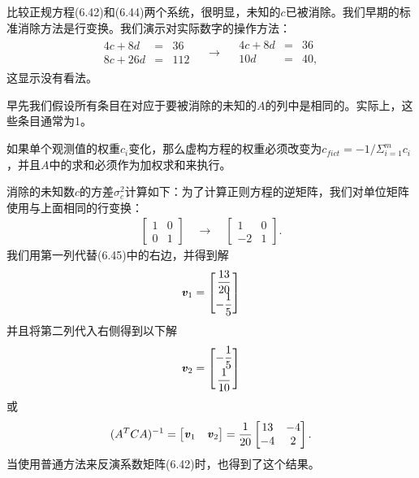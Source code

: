 比较正规方程(6.42)和(6.44)两个系统，很明显，未知的$c$已被消除。我们早期的标准消除方法是行变换。我们演示对实际数字的操作方法：
\begin{align}
\begin{aligned}
4c+8d & = & 36 \\
8c+26d & = & 112
\end{aligned}  \quad 
\rightarrow    \quad 
\begin{aligned}
4c+8d & = & 36\\
10d   & = & 40,
\end{aligned}
\end{align}
这显示没有看法。

早先我们假设所有条目在对应于要被消除的未知的$A$的列中是相同的。实际上，这些条目通常为1。

如果单个观测值的权重$c_{i}$变化，那么虚构方程的权重必须改变为$ c_{fict} = -1/\Sigma^{m}_{i=1}c_{i}$，并且$A$中的求和必须作为加权求和来执行。

消除的未知数$c$的方差$ \sigma^{2}_{c}$计算如下：为了计算正则方程的逆矩阵，我们对单位矩阵使用与上面相同的行变换：
\begin{align*}
\begin{bmatrix}
1 & 0\\
0 & 1
\end{bmatrix}
\quad
\rightarrow
\quad
\begin{bmatrix}
1 & 0\\
-2 & 1
\end{bmatrix}.
\end{align*}
我们用第一列代替(6.45)中的右边，并得到解
\begin{align*}
\textbf{\textit{v}}_{1} = 
\begin{bmatrix}
\dfrac{13}{20}\\
-\dfrac{1}{5}
\end{bmatrix}
\end{align*}
并且将第二列代入右侧得到以下解
\begin{align*}
\textbf{\textit{v}}_{2} = 
\begin{bmatrix}
-\dfrac{1}{5}\\
\dfrac{1}{10}
\end{bmatrix}
\end{align*}
或
\begin{align*}
(A^{T}CA)^{-1} = 
\begin{bmatrix}
\textbf{\textit{v}}_{1} & \textbf{\textit{v}}_{2}
\end{bmatrix} =
\dfrac{1}{20}
\begin{bmatrix}
13 & -4\\
-4 & 2 
\end{bmatrix}.
\end{align*}
当使用普通方法来反演系数矩阵(6.42)时，也得到了这个结果。

